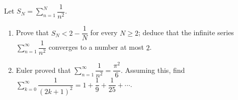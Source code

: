 Let $S_N=\displaystyle\sum_{n=1}^{N}\dfrac{1}{n^2}$.
\begin{enumerate}
\item[(a)] Prove that $S_N<2-\dfrac{1}{N}$ for every $N\ge2$; deduce that the infinite series $\displaystyle\sum_{n=1}^{\infty}\dfrac{1}{n^2}$ converges to a number at most $2$.
\item[(b)] Euler proved that $\displaystyle\sum_{n=1}^{\infty}\dfrac{1}{n^2}=\dfrac{\pi^2}{6}$. Assuming this, find $\displaystyle\sum_{k=0}^{\infty}\dfrac{1}{(2k+1)^2}=1+\dfrac{1}{9}+\dfrac{1}{25}+\cdots$.
\end{enumerate}
